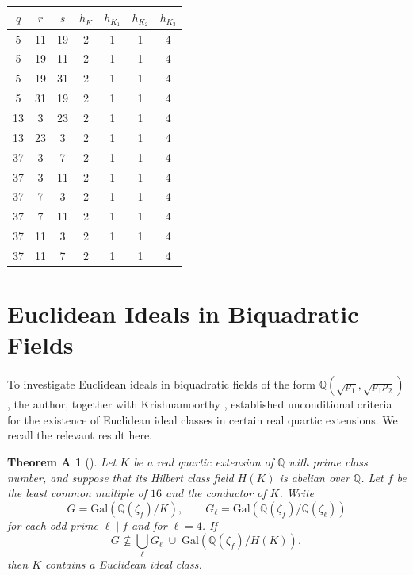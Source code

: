 \documentclass[12 pt]{amsart}
\newcommand{\Q}{\mathbb{Q}}
\newcommand\Gal{{\mathrm {Gal}}}
\newtheorem*{theoremquartic}{Theorem A}
\theoremstyle{definition}
\theoremstyle{remark}
\begin{document}
\begin{center}
\begin{tabular}{|c|c|c|c|c|c|c|}
\hline 
$q$ & $r$ & $s$ & $h_ K$  & $h_{K_1}$ & $h_{K_2}$ & $h_{K_3}$ \\
\hline
5  & 11 & 19 & 2 & 1 & 1 & 4 \\
5  & 19 & 11 & 2 & 1 & 1 & 4 \\
5  & 19 & 31 & 2 & 1 & 1 & 4 \\
5  & 31 & 19 & 2 & 1 & 1 & 4 \\
13 & 3  & 23 & 2 & 1 & 1 & 4 \\
13 & 23 & 3  & 2 & 1 & 1 & 4 \\
37 & 3  & 7  & 2 & 1 & 1 & 4 \\
37 & 3  & 11 & 2 & 1 & 1 & 4 \\
37 & 7  & 3  & 2 & 1 & 1 & 4 \\
37 & 7  & 11 & 2 & 1 & 1 & 4 \\
37 & 11 & 3  & 2 & 1 & 1 & 4 \\
37 & 11 & 7  & 2 & 1 & 1 & 4 \\
\hline
\end{tabular}
\end{center}


\section{Euclidean Ideals in Biquadratic Fields}\label{sec:euclidean}

To investigate Euclidean ideals in biquadratic fields of the form 
$\Q(\sqrt{p_1},\sqrt{p_1p_2})$, the author, together with Krishnamoorthy
\cite{KrPa25}, established unconditional criteria for the existence of 
Euclidean ideal classes in certain real quartic extensions. 
We recall the relevant result here.

\begin{theoremquartic}[{\cite{KrPa25}}]\label{thm:Quatric}
Let $K$ be a real quartic extension of $\Q$ with prime class number, and suppose
that its Hilbert class field $H(K)$ is abelian over $\Q$.  
Let $f$ be the least common multiple of $16$ and the conductor of $K$.  
Write 
\[
G=\Gal(\Q(\zeta_f)/K),
\qquad
G_\ell=\Gal(\Q(\zeta_f)/\Q(\zeta_\ell))
\]
for each odd prime $\ell\mid f$ and for $\ell=4$.  
If
\[
G\not\subseteq \bigcup_{\ell} G_\ell \;\cup\; \Gal(\Q(\zeta_f)/H(K)),
\]
then $K$ contains a Euclidean ideal class.
\end{theoremquartic}

\medskip
\end{document}

